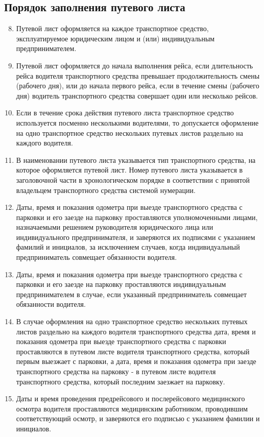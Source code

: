 \documentclass[../nirs.tex]{subfiles}
\begin{document}
\subsection{Порядок заполнения путевого листа}
\begin{enumerate}
	\setcounter{enumi}{7}
	\item Путевой лист оформляется на каждое транспортное средство,
		эксплуатируемое юридическим лицом и (или) индивидуальным
		предпринимателем.
	\item Путевой лист оформляется до начала выполнения рейса, если длительность
		рейса водителя транспортного средства превышает продолжительность смены
		(рабочего дня), или до начала первого рейса, если в течение смены
		(рабочего дня) водитель транспортного средства совершает один или
		несколько рейсов.
	\item Если в течение срока действия путевого листа транспортное средство
		используется посменно несколькими водителями, то допускается оформление
		на одно транспортное средство нескольких путевых листов раздельно на
		каждого водителя.
	\item В наименовании путевого листа указывается тип транспортного средства,
		на которое оформляется путевой лист. Номер путевого листа указывается в
		заголовочной части в хронологическом порядке в соответствии с принятой
		владельцем транспортного средства системой нумерации.
	\item Даты, время и показания одометра при выезде транспортного средства с
		парковки и его заезде на парковку проставляются уполномоченными лицами,
		назначаемыми решением руководителя юридического лица или индивидуального
		предпринимателя, и заверяются их подписями с указанием фамилий и
		инициалов, за исключением случаев, когда индивидуальный предприниматель
		совмещает обязанности водителя.
	\item Даты, время и показания одометра при выезде транспортного средства с
		парковки и его заезде на парковку проставляются индивидуальным
		предпринимателем в случае, если указанный предприниматель совмещает
		обязанности водителя.
	\item В случае оформления на одно транспортное средство нескольких путевых
		листов раздельно на каждого водителя транспортного средства дата, время
		и показания одометра при выезде транспортного средства с парковки
		проставляются в путевом листе водителя транспортного средства, который
		первым выезжает с парковки, а дата, время и показания одометра при
		заезде транспортного средства на парковку - в путевом листе водителя
		транспортного средства, который последним заезжает на парковку.
	\item Даты и время проведения предрейсового и послерейсового медицинского
		осмотра водителя проставляются медицинским работником, проводившим
		соответствующий осмотр, и заверяются его подписью с указанием фамилии и
		инициалов.


\end{enumerate}
\end{document}
